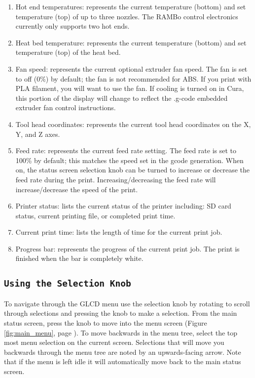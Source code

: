 \begin{enumerate}
\item Hot end temperatures: represents the current temperature (bottom) and set temperature (top) of up to three nozzles. The RAMBo control electronics currently only supports two hot ends.
\item Heat bed temperature: represents the current temperature (bottom) and set temperature (top) of the heat bed.
\item Fan speed: represents the current optional extruder fan speed. The fan is set to off (0\%) by default; the fan is not recommended for ABS. If you print with PLA filament, you will want to use the fan. If cooling is turned on in Cura, this portion of the display will change to reflect the .g-code embedded extruder fan control instructions.
\item Tool head coordinates: represents the current tool head coordinates on the X, Y, and Z axes.
\item Feed rate: represents the current feed rate setting. The feed rate is set to 100\% by default; this matches the speed set in the gcode generation. When on, the status screen selection knob can be turned to increase or decrease the feed rate during the print. Increasing/decreasing the feed rate will increase/decrease the speed of the print.
\item Printer status: lists the current status of the printer including: SD card status, current printing file, or completed print time.
\item Current print time: lists the length of time for the current print job.
\item Progress bar: represents the progress of the current print job. The print is finished when the bar is completely white.
\end{enumerate}


\subsection{\texttt{Using the Selection Knob}}
To navigate through the GLCD menu use the selection knob by rotating to scroll through selections and pressing the knob to make a selection. From the main status screen, press the knob to move into the menu screen (Figure \ref{fig:main_menu}, page \pageref{fig:main_menu}). To move backwards in the menu tree, select the top most menu selection on the current screen. Selections that will move you backwards through the menu tree are noted by an upwards-facing arrow. Note that if the menu is left idle it will automatically move back to the main status screen.

